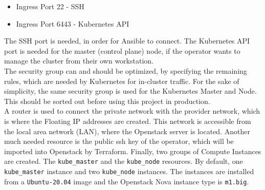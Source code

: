 \begin{itemize}
	\item Ingress Port 22 - SSH
	\item Ingress Port 6443 - Kubernetes API
\end{itemize}

\noindent
The SSH port is needed, in order for Ansible to connect.
The Kubernetes API port is needed for the master (control plane) node,
if the operator wants to manage the cluster from their own workstation. \\

\noindent
The security group can and should be optimized, by specifying the remaining
rules, which are needed by Kubernetes for in-cluster traffic.
For the sake of 
simplicity, the same security group is used for the Kubernetes Master and Node.
This should be sorted out before using this project in production. \\

\noindent
A router is used to connect the private network with the provider network,
which is where the Floating IP addresses are created. 
This network is accessible from the local area network (LAN),
where the Openstack server is located. 
Another much needed resource is the public ssh key of the operator,
which will be imported into Openstack by Terraform. 
Finally, two groups of Compute Instances are created. 
The \verb|kube_master| and the \verb|kube_node| resources.
By default, one \verb|kube_master| instance and two \verb|kube_node| instances.
The instances are installed from a \verb|Ubuntu-20.04| image and the 
Openstack Nova instance type is \verb|m1.big|.

